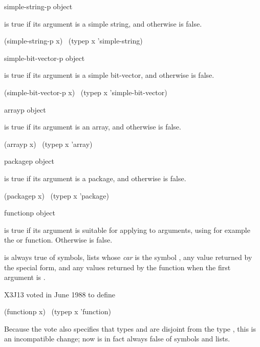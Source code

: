 \begin{defun}[Function]
simple-string-p object

 is true if its argument is a simple string,
and otherwise is false.
\begin{lisp}
(simple-string-p x) \EQ\ (typep x 'simple-string)
\end{lisp}
\end{defun}

\begin{defun}[Function]
simple-bit-vector-p object

 is true if its argument is a simple bit-vector,
and otherwise is false.
\begin{lisp}
(simple-bit-vector-p x) \EQ\ (typep x 'simple-bit-vector)
\end{lisp}
\end{defun}

\begin{defun}[Function]
arrayp object

 is true if its argument is an array,
and otherwise is false.
\begin{lisp}
(arrayp x) \EQ\ (typep x 'array)
\end{lisp}
\end{defun}

\begin{defun}[Function]
packagep object

 is true if its argument is a package,
and otherwise is false.
\begin{lisp}
(packagep x) \EQ\ (typep x 'package)
\end{lisp}
\end{defun}

\begin{defun}[Function]
functionp object

\begin{obsolete}
 is true if its argument is suitable for applying
to arguments, using for example the  or  function.
Otherwise  is false.

 is always true of symbols, lists whose {\it car}
is the symbol , any value returned by the 
special form, and any values returned by the function 
when the first argument is {\nil}.
\end{obsolete}
\begin{newer}
X3J13 voted in June 1988 
to define
\begin{lisp}
(functionp x) \EQ\ (typep x 'function)
\end{lisp}
Because the vote also specifies that types  and  are disjoint
from the type , this is an incompatible change;
now  is in fact always false of symbols and lists.
\end{newer}
\end{defun}

